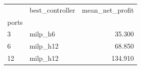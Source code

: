 \begin{tabular}{llr}
\toprule
 & best_controller & mean_net_profit \\
ports &  &  \\
\midrule
3 & milp_h6 & 35.300 \\
6 & milp_h12 & 68.850 \\
12 & milp_h12 & 134.910 \\
\bottomrule
\end{tabular}
